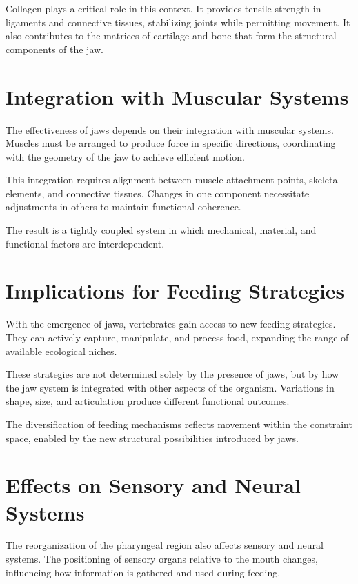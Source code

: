 \documentclass[11pt,oneside]{book}
\begin{document}
Collagen plays a critical role in this context. It provides tensile strength in ligaments and connective tissues, stabilizing joints while permitting movement. It also contributes to the matrices of cartilage and bone that form the structural components of the jaw.

\section{Integration with Muscular Systems}

The effectiveness of jaws depends on their integration with muscular systems. Muscles must be arranged to produce force in specific directions, coordinating with the geometry of the jaw to achieve efficient motion.

This integration requires alignment between muscle attachment points, skeletal elements, and connective tissues. Changes in one component necessitate adjustments in others to maintain functional coherence.

The result is a tightly coupled system in which mechanical, material, and functional factors are interdependent.

\section{Implications for Feeding Strategies}

With the emergence of jaws, vertebrates gain access to new feeding strategies. They can actively capture, manipulate, and process food, expanding the range of available ecological niches.

These strategies are not determined solely by the presence of jaws, but by how the jaw system is integrated with other aspects of the organism. Variations in shape, size, and articulation produce different functional outcomes.

The diversification of feeding mechanisms reflects movement within the constraint space, enabled by the new structural possibilities introduced by jaws.

\section{Effects on Sensory and Neural Systems}

The reorganization of the pharyngeal region also affects sensory and neural systems. The positioning of sensory organs relative to the mouth changes, influencing how information is gathered and used during feeding.
\end{document}
